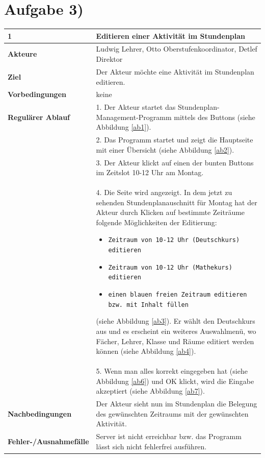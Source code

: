 \documentclass{swp1}
\begin{document}
\section*{Aufgabe 3)}

	
	\begin{tabular}
		{|p{5cm}|p{10cm}|} \hline \textbf{1} & \textbf{Editieren einer Aktivität im Stundenplan} \\
		\hline \textbf{Akteure} & Ludwig Lehrer, Otto Oberstufenkoordinator, Detlef Direktor\\
		\hline \textbf{Ziel} & Der Akteur möchte eine Aktivität im Stundenplan editieren. \\
		\hline \textbf{Vorbedingungen} & keine \\
		\hline \textbf{Regulärer Ablauf} & 1. Der Akteur startet das Stundenplan-Management-Programm mittels des Buttons (siehe Abbildung \ref{ab1}). \\
		&2. Das Programm startet und zeigt die Hauptseite mit einer Übersicht (siehe Abbildung \ref{ab2}). \\
		&3. Der Akteur klickt auf einen der bunten Buttons im Zeitslot 10-12 Uhr am Montag. \\
		&4. Die Seite wird angezeigt. In dem jetzt zu sehenden Stundenplanauschnitt für Montag hat der Akteur durch Klicken auf bestimmte Zeiträume folgende Möglichkeiten der Editierung:
		\begin{itemize}
		\item \texttt{Zeitraum von 10-12 Uhr (Deutschkurs) editieren}
		\item \texttt{Zeitraum von 10-12 Uhr (Mathekurs) editieren}
		\item \texttt{einen blauen freien Zeitraum editieren bzw. mit Inhalt füllen}
\end{itemize}	
(siehe Abbildung \ref{ab3}).	   
 Er wählt den Deutschkurs aus und es erscheint ein weiteres Auswahlmenü, wo Fächer, Lehrer, Klasse und Räume editiert werden können (siehe Abbildung \ref{ab4}).\\
&5. Wenn man alles korrekt eingegeben hat (siehe Abbildung \ref{ab6}) und OK klickt, wird die Eingabe akzeptiert (siehe Abbildung \ref{ab7}).\\
		\hline \textbf{Nachbedingungen} & Der Akteur sieht nun im Stundenplan die Belegung des gewünschten Zeitraums mit der gewünschten Aktivität. \\
		\hline \textbf{Fehler-/Ausnahmefälle} & Server ist nicht erreichbar bzw. das Programm lässt sich nicht fehlerfrei ausführen. \\
		\hline 
	\end{tabular}
\end{document}
